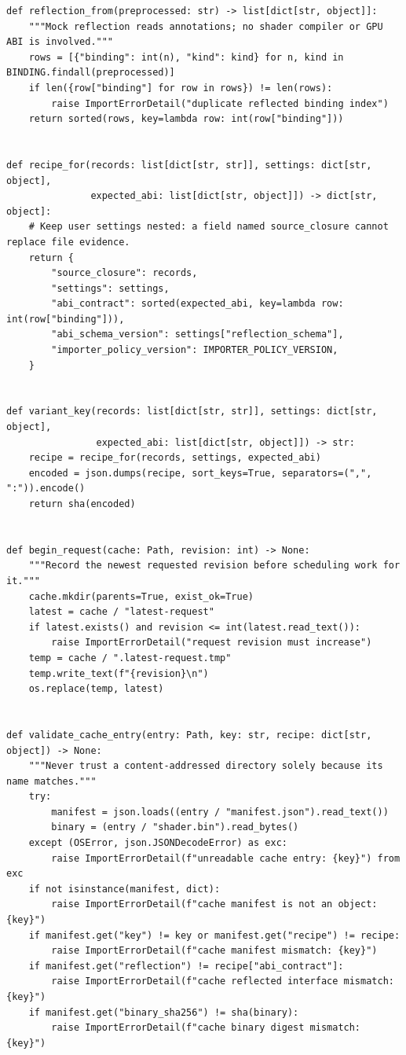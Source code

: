 \begin{verbatim}
def reflection_from(preprocessed: str) -> list[dict[str, object]]:
    """Mock reflection reads annotations; no shader compiler or GPU ABI is involved."""
    rows = [{"binding": int(n), "kind": kind} for n, kind in BINDING.findall(preprocessed)]
    if len({row["binding"] for row in rows}) != len(rows):
        raise ImportErrorDetail("duplicate reflected binding index")
    return sorted(rows, key=lambda row: int(row["binding"]))


def recipe_for(records: list[dict[str, str]], settings: dict[str, object],
               expected_abi: list[dict[str, object]]) -> dict[str, object]:
    # Keep user settings nested: a field named source_closure cannot replace file evidence.
    return {
        "source_closure": records,
        "settings": settings,
        "abi_contract": sorted(expected_abi, key=lambda row: int(row["binding"])),
        "abi_schema_version": settings["reflection_schema"],
        "importer_policy_version": IMPORTER_POLICY_VERSION,
    }


def variant_key(records: list[dict[str, str]], settings: dict[str, object],
                expected_abi: list[dict[str, object]]) -> str:
    recipe = recipe_for(records, settings, expected_abi)
    encoded = json.dumps(recipe, sort_keys=True, separators=(",", ":")).encode()
    return sha(encoded)


def begin_request(cache: Path, revision: int) -> None:
    """Record the newest requested revision before scheduling work for it."""
    cache.mkdir(parents=True, exist_ok=True)
    latest = cache / "latest-request"
    if latest.exists() and revision <= int(latest.read_text()):
        raise ImportErrorDetail("request revision must increase")
    temp = cache / ".latest-request.tmp"
    temp.write_text(f"{revision}\n")
    os.replace(temp, latest)


def validate_cache_entry(entry: Path, key: str, recipe: dict[str, object]) -> None:
    """Never trust a content-addressed directory solely because its name matches."""
    try:
        manifest = json.loads((entry / "manifest.json").read_text())
        binary = (entry / "shader.bin").read_bytes()
    except (OSError, json.JSONDecodeError) as exc:
        raise ImportErrorDetail(f"unreadable cache entry: {key}") from exc
    if not isinstance(manifest, dict):
        raise ImportErrorDetail(f"cache manifest is not an object: {key}")
    if manifest.get("key") != key or manifest.get("recipe") != recipe:
        raise ImportErrorDetail(f"cache manifest mismatch: {key}")
    if manifest.get("reflection") != recipe["abi_contract"]:
        raise ImportErrorDetail(f"cache reflected interface mismatch: {key}")
    if manifest.get("binary_sha256") != sha(binary):
        raise ImportErrorDetail(f"cache binary digest mismatch: {key}")



\end{verbatim}

